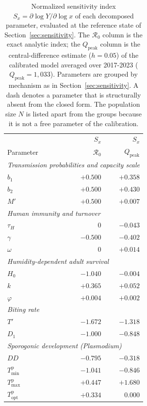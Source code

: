 \documentclass[a4paper,fleqn]{cas-dc}
\begin{document}
\begin{table}[H]
\centering
\caption{Normalized sensitivity index $S_x = \partial\log Y/\partial\log x$ of each decomposed parameter, evaluated at the reference state of Section~\ref{sec:sensitivity}. The $\mathcal{R}_0$ column is the exact analytic index; the $Q_{\mathrm{peak}}$ column is the central-difference estimate ($h = 0.05$) of the calibrated model averaged over 2017-2023 ($Q_{\mathrm{peak}} = 1{,}033$). Parameters are grouped by mechanism as in Section~\ref{sec:sensitivity}. A dash denotes a parameter that is structurally absent from the closed form. The population size $N$ is listed apart from the groups because it is not a free parameter of the calibration.}
\label{tbl:index}
\begin{tabular}{lrrr}
\toprule
 & & $S_x$ & $S_x$\\
Parameter & & $\mathcal{R}_0$ & $Q_{\mathrm{peak}}$\\
\midrule
\multicolumn{4}{l}{\itshape Transmission probabilities and capacity scale}\\
$b_1$ & & $+0.500$ & $+0.358$\\
$b_2$ & & $+0.500$ & $+0.430$\\
$M'$ & & $+0.500$ & $+0.007$\\
\midrule
\multicolumn{4}{l}{\itshape Human immunity and turnover}\\
$\tau_H$ & & $0$ & $-0.043$\\
$\gamma$ & & $-0.500$ & $-0.402$\\
$\omega$ & & $0$ & $+0.014$\\
\midrule
\multicolumn{4}{l}{\itshape Humidity-dependent adult survival}\\
$H_0$ & & $-1.040$ & $-0.004$\\
$k$ & & $+0.365$ & $+0.052$\\
$\varphi$ & & $+0.004$ & $+0.002$\\
\midrule
\multicolumn{4}{l}{\itshape Biting rate}\\
$T'$ & & $-1.672$ & $-1.318$\\
$D_1$ & & $-1.000$ & $-0.848$\\
\midrule
\multicolumn{4}{l}{\itshape Sporogonic development (\textit{Plasmodium})}\\
$DD$ & & $-0.795$ & $-0.318$\\
$T_{\min}^{\mathrm{p}}$ & & $-1.041$ & $-0.846$\\
$T_{\max}^{\mathrm{p}}$ & & $+0.447$ & $+1.680$\\
$T_{\mathrm{opt}}^{\mathrm{p}}$ & & $+0.334$ & $0.000$\\

\end{tabular}
\end{table}
\end{document}
